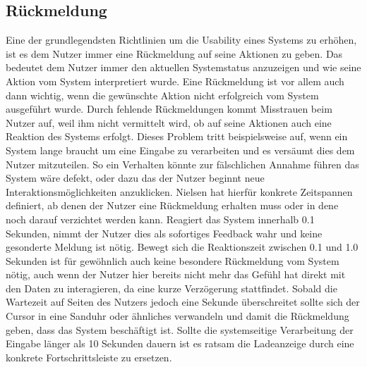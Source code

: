 \subsection*{Rückmeldung}

Eine der grundlegendsten Richtlinien um die Usability eines Systems zu erhöhen, ist es dem Nutzer immer eine Rückmeldung auf seine Aktionen zu geben.
Das bedeutet dem Nutzer immer den aktuellen Systemstatus anzuzeigen und wie seine Aktion vom System interpretiert wurde.
Eine Rückmeldung ist vor allem auch dann wichtig, wenn die gewünschte Aktion nicht erfolgreich vom System ausgeführt wurde.
Durch fehlende Rückmeldungen kommt Misstrauen beim Nutzer auf, weil ihm nicht vermittelt wird, ob auf seine Aktionen auch eine Reaktion des Systems erfolgt\cite{Knight.2019c}.
Dieses Problem tritt beispielsweise auf, wenn ein System lange braucht um eine Eingabe zu verarbeiten und es versäumt dies dem Nutzer mitzuteilen.
So ein Verhalten könnte zur fälschlichen Annahme führen das System wäre defekt, oder dazu das der Nutzer beginnt neue Interaktionsmöglichkeiten anzuklicken.
Nielsen hat hierfür konkrete Zeitspannen definiert, ab denen der Nutzer eine Rückmeldung erhalten muss oder in dene noch darauf verzichtet werden kann.\cite{.b}
Reagiert das System innerhalb 0.1 Sekunden, nimmt der Nutzer dies als sofortiges Feedback wahr und keine gesonderte Meldung ist nötig.
Bewegt sich die Reaktionszeit zwischen 0.1 und 1.0 Sekunden ist für gewöhnlich auch keine besondere Rückmeldung vom System nötig, auch wenn der Nutzer hier bereits nicht mehr das Gefühl hat direkt mit den Daten zu interagieren, da eine kurze Verzögerung stattfindet.
Sobald die Wartezeit auf Seiten des Nutzers jedoch eine Sekunde überschreitet sollte sich der Cursor in eine Sanduhr oder ähnliches verwandeln und damit die Rückmeldung geben, dass das System beschäftigt ist.
Sollte die systemseitige Verarbeitung der Eingabe länger als 10 Sekunden dauern ist es ratsam die Ladeanzeige durch eine konkrete Fortschrittsleiste zu ersetzen.

